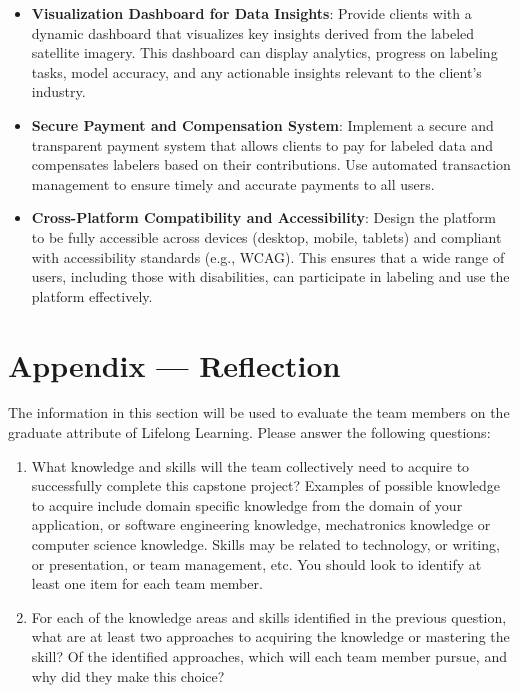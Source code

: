 \documentclass[12pt]{article}
\begin{document}
\begin{itemize}[leftmargin=2cm]
    \item \textbf{Visualization Dashboard for Data Insights}: Provide clients with a dynamic dashboard that visualizes key insights derived from the labeled satellite imagery. This dashboard can display analytics, progress on labeling tasks, model accuracy, and any actionable insights relevant to the client’s industry.
    
    \item \textbf{Secure Payment and Compensation System}: Implement a secure and transparent payment system that allows clients to pay for labeled data and compensates labelers based on their contributions. Use automated transaction management to ensure timely and accurate payments to all users.
    
    \item \textbf{Cross-Platform Compatibility and Accessibility}: Design the platform to be fully accessible across devices (desktop, mobile, tablets) and compliant with accessibility standards (e.g., WCAG). This ensures that a wide range of users, including those with disabilities, can participate in labeling and use the platform effectively.
\end{itemize}

\newpage{}
\section*{Appendix --- Reflection}

The information in this section will be used to evaluate the team members on the
graduate attribute of Lifelong Learning.  Please answer the following questions:

\begin{enumerate}
  \item What knowledge and skills will the team collectively need to acquire to
  successfully complete this capstone project?  Examples of possible knowledge
  to acquire include domain specific knowledge from the domain of your
  application, or software engineering knowledge, mechatronics knowledge or
  computer science knowledge.  Skills may be related to technology, or writing,
  or presentation, or team management, etc.  You should look to identify at
  least one item for each team member.
  \item For each of the knowledge areas and skills identified in the previous
  question, what are at least two approaches to acquiring the knowledge or
  mastering the skill?  Of the identified approaches, which will each team
  member pursue, and why did they make this choice?
\end{enumerate}
\end{document}

